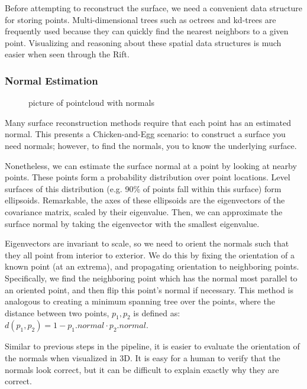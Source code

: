 \documentclass[10pt,twocolumn,letterpaper]{article}
\begin{document}
Before attempting to reconstruct the surface, we need a convenient data structure for storing points. Multi-dimensional trees such as octrees and kd-trees are frequently used because they can quickly find the nearest neighbors to a given point.\cite{poisson} Visualizing and reasoning about these spatial data structures is much easier when seen through the Rift.

\subsubsection{Normal Estimation}

\begin{figure}[t]
  \begin{center}
    \fbox{\rule{0pt}{2in} \rule{0.9\linewidth}{0pt}}
  \end{center}
  \caption{picture of pointcloud with normals}
\end{figure}

Many surface reconstruction methods require that each point has an estimated normal. This presents a Chicken-and-Egg scenario: to construct a surface you need normals; however, to find the normals, you to know the underlying surface.

Nonetheless, we can estimate the surface normal at a point by looking at nearby points. These points form a probability distribution over point locations. Level surfaces of this distribution (e.g. 90\% of points fall within this surface) form ellipsoids. Remarkable, the axes of these ellipsoids are the eigenvectors of the covariance matrix, scaled by their eigenvalue. Then, we can approximate the surface normal by taking the eigenvector with the smallest eigenvalue.

Eigenvectors are invariant to scale, so we need to orient the normals such that they all point from interior to exterior. We do this by fixing the orientation of a known point (at an extrema), and propagating orientation to neighboring points. Specifically, we find the neighboring point which has the normal most parallel to an oriented point, and then flip this point's normal if necessary. This method is analogous to creating a minimum spanning tree over the points, where the distance between two points, $p_1, p_2$ is defined as: $d(p_1, p_2) = 1-p_1.normal \cdot p_2.normal$.

Similar to previous steps in the pipeline, it is easier to evaluate the orientation of the normals when visualized in 3D. It is easy for a human to verify that the normals look correct, but it can be difficult to explain exactly why they are correct.
\end{document}
